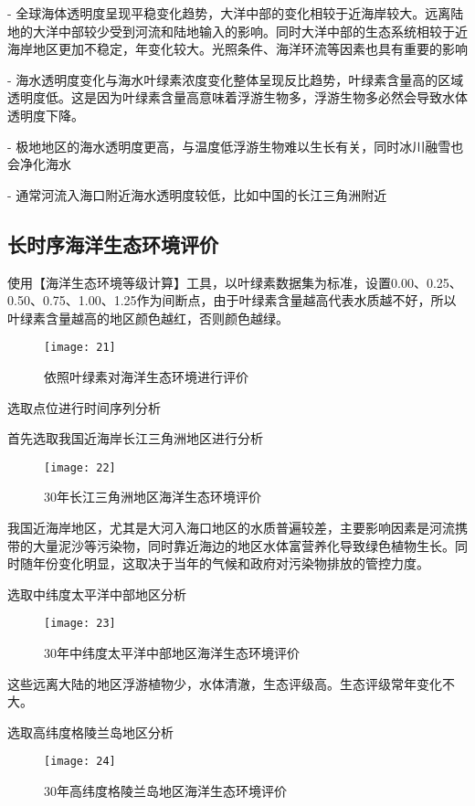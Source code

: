 \documentclass{source/Report}
\begin{document}
- 全球海体透明度呈现平稳变化趋势，大洋中部的变化相较于近海岸较大。远离陆地的大洋中部较少受到河流和陆地输入的影响。同时大洋中部的生态系统相较于近海岸地区更加不稳定，年变化较大。光照条件、海洋环流等因素也具有重要的影响

- 海水透明度变化与海水叶绿素浓度变化整体呈现反比趋势，叶绿素含量高的区域透明度低。这是因为叶绿素含量高意味着浮游生物多，浮游生物多必然会导致水体透明度下降。

- 极地地区的海水透明度更高，与温度低浮游生物难以生长有关，同时冰川融雪也会净化海水

- 通常河流入海口附近海水透明度较低，比如中国的长江三角洲附近

\subsection{长时序海洋生态环境评价}

使用【海洋生态环境等级计算】工具，以叶绿素数据集为标准，设置0.00、0.25、0.50、0.75、1.00、1.25作为间断点，由于叶绿素含量越高代表水质越不好，所以叶绿素含量越高的地区颜色越红，否则颜色越绿。

\begin{figure}[H]
    \centering
    \texttt{[image: 21]}
    \caption{依照叶绿素对海洋生态环境进行评价}
\end{figure}

选取点位进行时间序列分析

首先选取我国近海岸长江三角洲地区进行分析

\begin{figure}[H]
    \centering
    \texttt{[image: 22]}
    \caption{30年长江三角洲地区海洋生态环境评价}
\end{figure}

我国近海岸地区，尤其是大河入海口地区的水质普遍较差，主要影响因素是河流携带的大量泥沙等污染物，同时靠近海边的地区水体富营养化导致绿色植物生长。同时随年份变化明显，这取决于当年的气候和政府对污染物排放的管控力度。

选取中纬度太平洋中部地区分析

\begin{figure}[H]
    \centering
    \texttt{[image: 23]}
    \caption{30年中纬度太平洋中部地区海洋生态环境评价}
\end{figure}

这些远离大陆的地区浮游植物少，水体清澈，生态评级高。生态评级常年变化不大。

选取高纬度格陵兰岛地区分析

\begin{figure}[H]
    \centering
    \texttt{[image: 24]}
    \caption{30年高纬度格陵兰岛地区海洋生态环境评价}
\end{figure}
\end{document}
